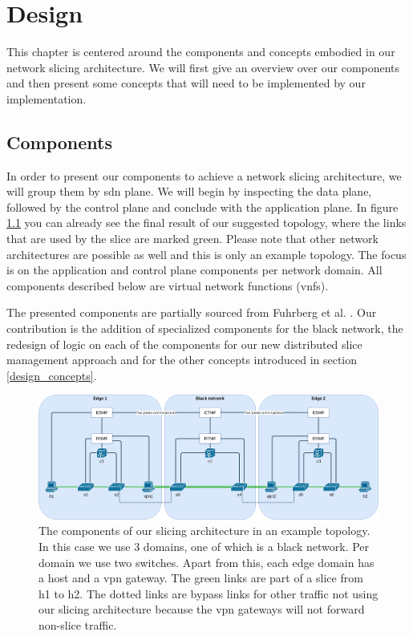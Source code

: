 \chapter{Design}
\label{design}

This chapter is centered around the components and concepts embodied in our network slicing architecture. We will first give an overview over our components and then present some concepts that will need to be implemented by our implementation.

\section{Components}
In order to present our components to achieve a network slicing architecture, we will group them by \acrshort{sdn} plane. We will begin by inspecting the data plane, followed by the control plane and conclude with the application plane. In figure \ref{fig:topology} you can already see the final result of our suggested topology, where the links that are used by the slice are marked green. Please note that other network architectures are possible as well and this is only an example topology. The focus is on the application and control plane components per network domain. All components described below are virtual network functions (\acrshort{vnf}s).

The presented components are partially sourced from Fuhrberg et al. \cite{SE4}. Our contribution is the addition of specialized components for the black network, the redesign of logic on each of the components for our new distributed slice management approach and for the other concepts introduced in section \ref{design_concepts}.

\begin{landscape}
\begin{figure}[ht]
        \centering
        \includegraphics[width=\linewidth]{images/chapter_5/topology.png}
        \caption[Slicing architecture components]{The components of our slicing architecture in an example topology. In this case we use 3 domains, one of which is a black network. Per domain we use two switches. Apart from this, each edge domain has a host and a \acrshort{vpn} gateway. The green links are part of a slice from h1 to h2. The dotted links are bypass links for other traffic not using our slicing architecture because the \acrshort{vpn} gateways will not forward non-slice traffic.}
        \label{fig:topology}
\end{figure}
\end{landscape}


